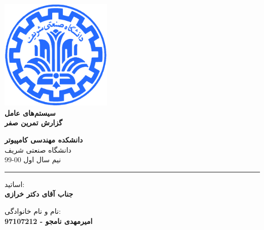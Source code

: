 \documentclass[12pt]{article}
\begin{document}
\begin{titlepage}
\begin{center}
        
\vspace*{0.7cm}

\includegraphics[width=0.4\textwidth]{sharif1.png}\\
\vspace{0.5cm}
\textbf{ \Huge{\emph ‌سیستم‌های عامل} }\\
\vspace{0.5cm}
\textbf{ \Large{ گزارش تمرین صفر} }
\vspace{0.2cm}
       
 
      \large \textbf{دانشکده مهندسی کامپیوتر}\\\vspace{0.2cm}
    \large   دانشگاه صنعتی شریف\\\vspace{0.2cm}
       \large   ﻧﯿﻢ سال اول 00-99 \\\vspace{0.2cm}
      \noindent\rule[1ex]{\linewidth}{1pt}
اساتید:\\
    \textbf{{جناب آقای دکتر خرازی}}


    \vspace{0.15cm}
نام و نام خانوادگی:\\

       
    \textbf{{امیرمهدی نامجو - 97107212}}
\end{center}
\end{titlepage}


\newpage
\pagestyle{fancy}
\fancyhf{}
\fancyfoot{}
\cfoot{\thepage}
\end{document}
